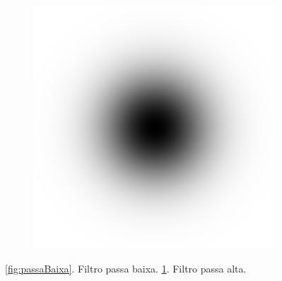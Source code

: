 \documentclass[
	article,			%
	11pt,				%
	oneside,			%
	a4paper,			%
	english,			%
	brazil,				%
	sumario=tradicional
	]{abntex2}
\begin{document}
\begin{figure}
\begin{subfigure}[b]{0.3\textwidth}
                \includegraphics[width=\textwidth,scale=1]{imagens/ex2/passaAlta.png}
                \caption{}
                \label{fig:passaAlta}
        \end{subfigure}
       
        \caption{ 
        \ref{fig:passaBaixa}. Filtro passa baixa.
        \ref{fig:passaAlta}. Filtro passa alta.
        }
	\label{fig:filtrosFrequencia}
\end{figure}
\end{document}
